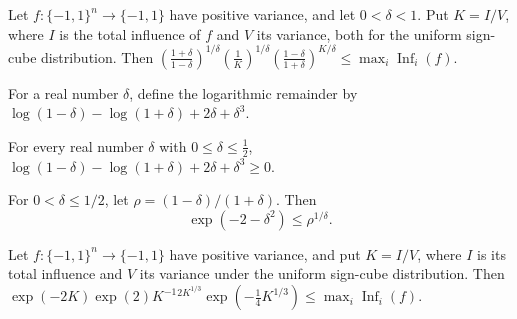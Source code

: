 \begin{theorem}
\label{FABL.exercise9_30_parameterized}
\leanok
{}
Let $f:\{−1,1\}^n\to\{−1,1\}$ have positive variance, and let $0<\delta<1$. Put $K=I/V$,
where $I$ is the total influence of $f$ and $V$ its variance, both for the uniform
sign-cube distribution. Then
$\left(\frac{1+\delta}{1-\delta}\right)^{1/\delta}\left(\frac1K\right)^{1/\delta}\left(\frac{1-\delta}{1+\delta}\right)^{K/\delta}\le\max_i\operatorname{Inf}_i(f)$.
\end{theorem}

\begin{definition}
\label{FABL.exercise9_30LogRemainder}
\leanok
For a real number $\delta$, define the logarithmic remainder by
$\log(1-\delta)-\log(1+\delta)+2\delta+\delta^3$.
\end{definition}

\begin{theorem}
\label{FABL.exercise9_30LogRemainder_nonneg}
\leanok
{}
For every real number $\delta$ with $0\le\delta\le\tfrac12$,
$\log(1-\delta)-\log(1+\delta)+2\delta+\delta^3\ge 0$.
\end{theorem}

\begin{theorem}
\label{FABL.exercise9_30_rho_rpow_inv_lower}
\leanok
{}
For $0<\delta\leq 1/2$, let $\rho=(1-\delta)/(1+\delta)$. Then
\[
\exp(-2-\delta^2)\leq \rho^{1/\delta}.
\]
\end{theorem}

\begin{theorem}
\label{FABL.exercise9_30_refined}
\leanok
{}
Let $f:\{−1,1\}^n\to\{−1,1\}$ have positive variance, and put $K=I/V$, where $I$ is its
total influence and $V$ its variance under the uniform sign-cube distribution. Then
$\exp(-2K)\exp(2)K^{-1}{}^{2K^{1/3}}\exp(-\tfrac14K^{1/3})\le\max_i\operatorname{Inf}_i(f)$.
\end{theorem}

